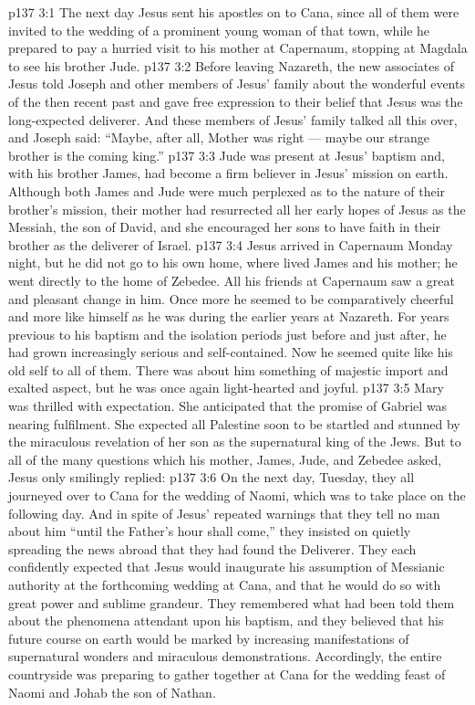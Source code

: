\vs p137 3:1 The next day Jesus sent his apostles on to Cana, since all of them were invited to the wedding of a prominent young woman of that town, while he prepared to pay a hurried visit to his mother at Capernaum, stopping at Magdala to see his brother Jude.
\vs p137 3:2 Before leaving Nazareth, the new associates of Jesus told Joseph and other members of Jesus’ family about the wonderful events of the then recent past and gave free expression to their belief that Jesus was the long\hyp{}expected deliverer. And these members of Jesus’ family talked all this over, and Joseph said: “Maybe, after all, Mother was right --- maybe our strange brother is the coming king.”
\vs p137 3:3 Jude was present at Jesus’ baptism and, with his brother James, had become a firm believer in Jesus’ mission on earth. Although both James and Jude were much perplexed as to the nature of their brother’s mission, their mother had resurrected all her early hopes of Jesus as the Messiah, the son of David, and she encouraged her sons to have faith in their brother as the deliverer of Israel.
\vs p137 3:4 \pc Jesus arrived in Capernaum Monday night, but he did not go to his own home, where lived James and his mother; he went directly to the home of Zebedee. All his friends at Capernaum saw a great and pleasant change in him. Once more he seemed to be comparatively cheerful and more like himself as he was during the earlier years at Nazareth. For years previous to his baptism and the isolation periods just before and just after, he had grown increasingly serious and self\hyp{}contained. Now he seemed quite like his old self to all of them. There was about him something of majestic import and exalted aspect, but he was once again light\hyp{}hearted and joyful.
\vs p137 3:5 Mary was thrilled with expectation. She anticipated that the promise of Gabriel was nearing fulfilment. She expected all Palestine soon to be startled and stunned by the miraculous revelation of her son as the supernatural king of the Jews. But to all of the many questions which his mother, James, Jude, and Zebedee asked, Jesus only smilingly replied: 
\vs p137 3:6 \pc On the next day, Tuesday, they all journeyed over to Cana for the wedding of Naomi, which was to take place on the following day. And in spite of Jesus’ repeated warnings that they tell no man about him “until the Father’s hour shall come,” they insisted on quietly spreading the news abroad that they had found the Deliverer. They each confidently expected that Jesus would inaugurate his assumption of Messianic authority at the forthcoming wedding at Cana, and that he would do so with great power and sublime grandeur. They remembered what had been told them about the phenomena attendant upon his baptism, and they believed that his future course on earth would be marked by increasing manifestations of supernatural wonders and miraculous demonstrations. Accordingly, the entire countryside was preparing to gather together at Cana for the wedding feast of Naomi and Johab the son of Nathan.
